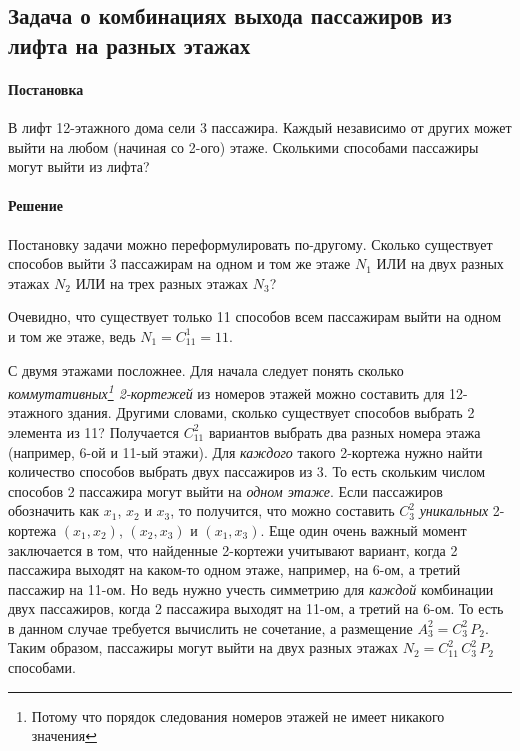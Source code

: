 \documentclass[%
	11pt,
	a4paper,
	utf8,
		]{article}
\begin{document}
\subsection{Задача о комбинациях выхода пассажиров из лифта на разных этажах}

\paragraph{Постановка} В лифт 12-этажного дома сели 3 пассажира. Каждый независимо от других может выйти на любом (начиная со 2-ого) этаже. Сколькими способами пассажиры могут выйти из лифта?

\paragraph{Решение} Постановку задачи можно переформулировать по-другому. Сколько существует способов выйти 3 пассажирам на одном и том же этаже $ N_1 $ ИЛИ на двух разных этажах $ N_2 $ ИЛИ на трех разных этажах $ N_3 $?

Очевидно, что существует только 11 способов всем пассажирам выйти на одном и том же этаже, ведь $ N_1 = C_{11}^1 = 11 $.

С двумя этажами посложнее. Для начала следует понять сколько \emph{коммутативных\footnote{Потому что порядок следования номеров этажей не имеет никакого значения} 2-кортежей} из номеров этажей можно составить для 12-этажного здания. Другими словами, сколько существует способов выбрать 2 элемента из 11? Получается $ C_{11}^2 $ вариантов выбрать два разных номера этажа (например, 6-ой и 11-ый этажи). Для \emph{каждого} такого 2-кортежа нужно найти количество способов выбрать двух пассажиров из 3. То есть скольким числом способов 2 пассажира могут выйти на \emph{одном этаже}. Если пассажиров обозначить как $ x_1 $, $ x_2 $ и $ x_3 $, то получится, что можно составить $ C_3^2 $ \emph{уникальных} 2-кортежа $ (x_1, x_2) $, $ (x_2, x_3) $ и $ (x_1, x_3) $. Еще один очень важный момент заключается в том, что найденные 2-кортежи учитывают вариант, когда 2 пассажира выходят на каком-то одном этаже, например, на 6-ом, а третий пассажир на 11-ом. Но ведь нужно учесть симметрию для \emph{каждой} комбинации двух пассажиров, когда 2 пассажира выходят на 11-ом, а третий на 6-ом. То есть в данном случае требуется вычислить не сочетание, а размещение $ A_3^2 = C_3^2 \, P_2 $. Таким образом, пассажиры могут выйти на двух разных этажах $ N_2 = C_{11}^2 \, C_3^2 \, P_2 $ способами.

\end{document}
